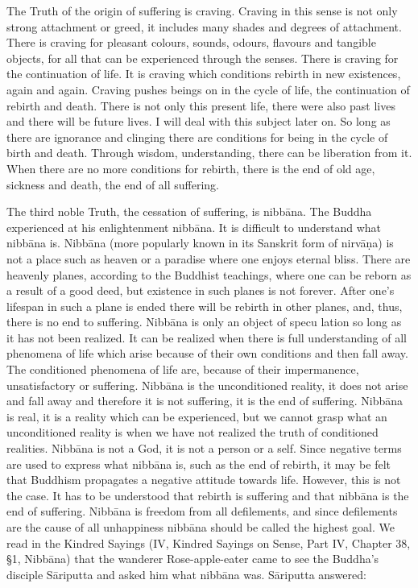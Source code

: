 \documentclass{book}
\begin{document}
The Truth of the origin of suffering is craving. Craving in this sense
is not only strong attachment or greed, it includes many shades and
degrees of attachment. There is craving for pleasant colours, sounds,
odours, flavours and tangible objects, for all that can be experienced
through the senses. There is craving for the continuation of life. It is
craving which conditions rebirth in new existences, again and again.
Craving pushes beings on in the cycle of life, the continuation of
rebirth and death. There is not only this present life, there were also
past lives and there will be future lives. I will deal with this subject
later on. So long as there are ignorance and clinging there are
conditions for being in the cycle of birth and death. Through wisdom,
understanding, there can be liberation from it. When there are no more
conditions for rebirth, there is the end of old age, sickness and death,
the end of all suffering.

The third noble Truth, the cessation of suffering, is nibbāna. The
Buddha experienced at his enlightenment nibbāna. It is difficult to
understand what nibbāna is. Nibbāna (more popularly known in its
Sanskrit form of nirvāṇa) is not a place such as heaven or a paradise
where one enjoys eternal bliss. There are heavenly planes, according to
the Buddhist teachings, where one can be reborn as a result of a good
deed, but existence in such planes is not forever. After one's lifespan
in such a plane is ended there will be rebirth in other planes, and,                                 thus, there is no end to suffering. Nibbāna is only an object of specu­                             lation so long as it has not been realized. It can be realized when there                                  is full understanding of all phenomena of life which arise because of                                  their own conditions and then fall away. The conditioned phenomena of                                    life are, because of their impermanence, unsatisfactory or suffer­ing.
Nibbāna is the unconditioned reality, it does not arise and fall away
and therefore it is not suffering, it is the end of suffering. Nibbāna
is real, it is a reality which can be experienced, but we cannot grasp
what an uncon­di­tioned reality is when we have not realized the truth
of condi­tioned realities. Nibbāna is not a God, it is not a person or a
self. Since negative terms are used to express what nibbāna is, such as
the end of rebirth, it may be felt that Buddhism propagates a negative
attitude towards life. However, this is not the case. It has to be
understood that rebirth is suffering and that nibbāna is the end of
suf­fering. Nibbāna is freedom from all defilements, and since
defilements are the cause of all unhappiness nibbāna should be called
the highest goal. We read in the Kindred Sayings (IV, Kindred Sayings on
Sense, Part IV, Chapter 38, §1, Nibbāna) that the wanderer
Rose-apple-eater came to see the Buddha's disciple Sāriputta and asked
him what nibbāna was. Sāriputta answered:
\end{document}
